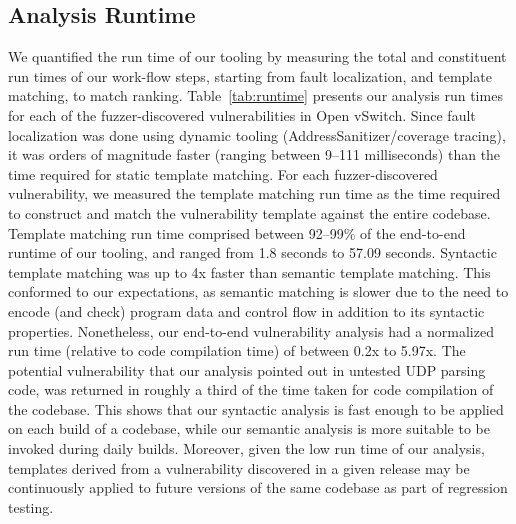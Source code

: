 \subsection{Analysis Runtime}

We quantified the run time of our tooling by measuring the total and constituent run times of our work-flow steps, starting from fault localization, and template matching, to match ranking.
Table~\ref{tab:runtime} presents our analysis run times for each of the fuzzer-discovered vulnerabilities in Open vSwitch.
Since fault localization was done using dynamic tooling (AddressSanitizer/coverage tracing), it was orders of magnitude faster (ranging between 9--111 milliseconds) than the time required for static template matching.
For each fuzzer-discovered vulnerability, we measured the template matching run time as the time required to construct and match the vulnerability template against the entire codebase.
Template matching run time comprised between 92--99\% of the end-to-end runtime of our tooling, and ranged from 1.8 seconds to 57.09 seconds.
Syntactic template matching was up to 4x faster than semantic template matching.
This conformed to our expectations, as semantic matching is slower due to the need to encode (and check) program data and control flow in addition to its syntactic properties.
Nonetheless, our end-to-end vulnerability analysis had a normalized run time (relative to code compilation time) of between 0.2x to 5.97x.
The potential vulnerability that our analysis pointed out in untested UDP parsing code, was returned in roughly a third of the time taken for code compilation of the codebase.
This shows that our syntactic analysis is fast enough to be applied on each build of a codebase, while our semantic analysis is more suitable to be invoked during daily builds.
Moreover, given the low run time of our analysis, templates derived from a vulnerability discovered in a given release may be continuously applied to future versions of the same codebase as part of regression testing.
